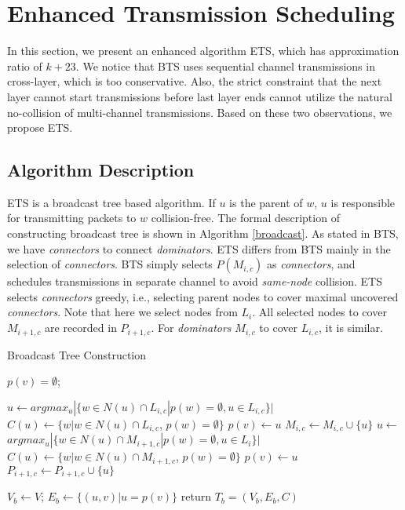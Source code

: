 \documentclass[10pt, conference]{IEEEtran}
\begin{document}
\section{Enhanced Transmission Scheduling} \label{ets}
In this section, we present an enhanced algorithm ETS, which
has approximation ratio of $k+23$. We notice that BTS uses
sequential channel transmissions in cross-layer, which is too
conservative. Also, the strict constraint that the next layer
cannot start transmissions before last layer ends cannot
utilize the natural no-collision of multi-channel
transmissions. Based on these two observations, we propose ETS.

\subsection{Algorithm Description}
ETS is a broadcast tree based algorithm. If $u$ is the parent
of $w$, $u$ is responsible for transmitting packets to $w$
collision-free. The formal description of constructing
broadcast tree is shown in Algorithm \ref{broadcast}. As stated
in BTS, we have \emph{connectors} to connect \emph{dominators}.
ETS differs from BTS mainly in the selection of
\emph{connectors}. BTS simply selects $P(M_{i,c})$ as
\emph{connectors}, and schedules transmissions in separate
channel to avoid \emph{same-node} collision. ETS selects
\emph{connectors} greedy, i.e., selecting parent nodes to cover
maximal uncovered \emph{connectors}. Note that here we select
nodes from $L_i$.  All selected nodes to cover $M_{i+1,c}$
are recorded in $P_{i+1,c}$. For \emph{dominators} $M_{i,c}$ to
cover $L_{i,c}$, it is similar.





\begin{algorithm}[tbp]  \label{broadcast}
\caption{Broadcast Tree Construction}
{
    $p(v) = \emptyset$;
}
{
 {
    {
        $u \leftarrow argmax_{u} |\{w \in N(u) \cap L_{i,c} | p(w) = \emptyset, u \in L_{i,c}\}|$\;
        $C(u) \leftarrow \{w | w \in N(u) \cap L_{i,c}$, $p(w) = \emptyset\}$\;
        {
            $p(v) \leftarrow u$\;
        }
        $M_{i,c} \leftarrow M_{i, c} \cup \{u\}$\;
    }
    {
        $u \leftarrow$ $argmax_{u} |\{w \in N(u) \cap M_{i+1,c} | p(w) = \emptyset, u \in L_i\}|$\;
        $C(u) \leftarrow \{w | w \in N(u) \cap M_{i+1,c}$, $p(w) = \emptyset\}$\;
        {
            $p(v) \leftarrow u$\;
        }
        $P_{i+1,c} \leftarrow P_{i+1, c} \cup \{u\}$\;
    }

 }
}
$V_b \leftarrow V$; $E_b \leftarrow \{(u,v)|u=p(v)\}$\;
return $T_b = (V_b, E_b, C)$\;
\end{algorithm}
\end{document}
